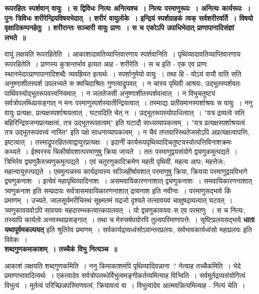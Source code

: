 	{\bfseries रूपरहितः स्पर्शवान् वायुः~। स द्विविधः नित्यः अनित्यश्च~। नित्यः परमाणुरूपः~। अनित्यः कार्यरूपः~। पुनः त्रिविधः शरीरेन्द्रियविषयभेदात्~। शरीरं वायुलोके~। इन्द्रियं स्पर्शग्राहकं त्वक् सर्वशरीरवर्ति~। विषयो वृक्षादिकम्पनहेतुः~। शरीरान्तः सञ्चारी वायुः प्राणः~। स च एकोऽपि उपाधिभेदात् प्राणापानादिसंज्ञां लभते~॥}\par
		वायुं लक्षयति रूपरहितेति~। आकाशादावतिव्याप्तिवारणाय स्पर्शवानिति~। पृथिव्यादावतिव्याप्तिवारणाय रूपरहितेति~। प्राणस्य कुत्रान्तर्भाव इत्यत आह - शरीरेति~। स च इति - एक एव प्राणः स्थानभेदात्प्राणापानादिशब्दैः व्यवह्रियत इत्यर्थः~। स्पर्शानुमेयो वायुः~। तथा हि - योऽयं वायौ वाति सति अनुष्णाशीतस्पर्श उपलभ्यते स क्वचिदाश्रितः गुणत्वाद्रूपवत्~। न चास्य पृथिवी आश्रयः, उद्भूतस्पर्शवतः पार्थिवस्योद्भूतरूपवत्त्वनियमात्~। न जलतेजसी अनुष्णाशीतस्पर्शवत्वात्~। न विभुचतुष्टयं सर्वत्रोपलब्धिप्रसङ्गात् न मनः परमाणुस्पर्शस्यातीन्द्रियत्वात्~। तस्माद्यः प्रतीयमानस्पर्शाश्रयः स वायुः~। ननु वायुः प्रत्यक्षः, प्रत्यक्षस्पर्शाश्रयत्वात्~, घटवदिति चेत् न~। उद्भूतरूपस्योपाधित्वात्~। "यत्र द्रव्यत्वे सति बहिरिन्द्रियजन्यप्रत्यक्षत्वं, तत्र उद्भूतरूपवत्वम्" इति घटादौ साध्यव्यापकत्वम्~। "यत्र प्रत्यक्षस्पर्शाश्रयत्वं तत्र उद्भूतरूपवत्त्वं नास्ति" इति पक्षे साधनाव्यापकत्वम्~। न चैवं तप्तवारिस्थतेजसोऽपि अप्रत्यक्षत्वापत्तिः, इष्टत्वात्~। तस्माद्रूपरहितत्वाद्वायुरप्रत्यक्षः~। इदानीं कार्यरूपपृथिव्यादिचतुष्टयस्योत्पत्तिविनाशक्रमः कथ्यते~। ईश्वरस्य चिकीर्षावशात्परमाणुषु क्रिया जायते~। ततः परमाणुद्वयसंयोगे द्व्यणुकमुत्पद्यते~। त्रिभिरेव द्व्यणुकैस्त्र्यणुकमुत्पद्यते~। एवं चतुरणुकादिक्रमेण महती पृथिवी, महत्य आपः; महत्तेजः; महान्वायुरुत्पद्यते~। एवमुत्पन्नस्य कार्यद्रव्यस्य सञ्जिहीर्षावशात् परमाणुषु क्रिया, क्रियया परमाणुद्वयविभागे द्व्यणुकनाशः~। इत्येवं महापृथिव्यादिनाशः~। असमवायिकारणनाशात् द्व्यणुकनाशः~। समवायिकारणनाशात् त्र्यणुकनाश इति सम्प्रदायः सर्वत्रासमवायिकारणनाशात् द्रव्यनाश इति नवीनाः~। परमाणुसद्भावे किं प्रमाणम्~। उच्यते, जालसूर्यमरीचिस्थं सूक्ष्मतमं यद्रजो दृश्यते तत्सावयवं चाक्षुषद्रव्यत्वात् घटवत्~। त्र्यणुकावयवोऽपि सावयवः महदारम्भकत्वात्कपालवत्~। यो द्व्यणुकावयवः स एव परमाणुः~। स च नित्यः, तस्यापि कार्यत्वे अनवस्थाप्रसङ्गात्~। तथा च मेरुसर्षपयोरपि तुल्यपरिमाणापत्तेः~। सृष्टिप्रलयसद्भावे {\bfseries धाता यथापूर्वमकल्पयत्} इति श्रुतिरेव प्रमाणम्~। सर्वकार्यद्रव्यध्वंसोऽवान्तरप्रलयः, सर्वभावकार्यध्वंसो महाप्रलयः इति विवेकः~।\\[10pt]
	{\bfseries शब्दगुणकमाकाशम्~। तच्चैकं विभु नित्यञ्च~॥}\par
		आकाशं लक्षयति शब्दगुणकमिति~। ननु किमाकाशमपि पृथिव्यादिवन्नाना~?
		नेत्याह तच्चैकमिति~। भेदे प्रमाणाभावादित्यर्थः~। एकत्वादेव सर्वत्रोपलब्धेर्विभुत्वमङ्गीकर्तव्यमित्याह विभ्विति~। सर्वमूर्तद्रव्यसंयोगित्वं विभुत्वं~। मूर्तत्वं परिच्छिन्नपरिमाणवत्वं, क्रियावत्वं वा~। विभुत्वादेव आत्मवन्नित्यमित्याह - नित्यं चेति~।\\[10pt]
